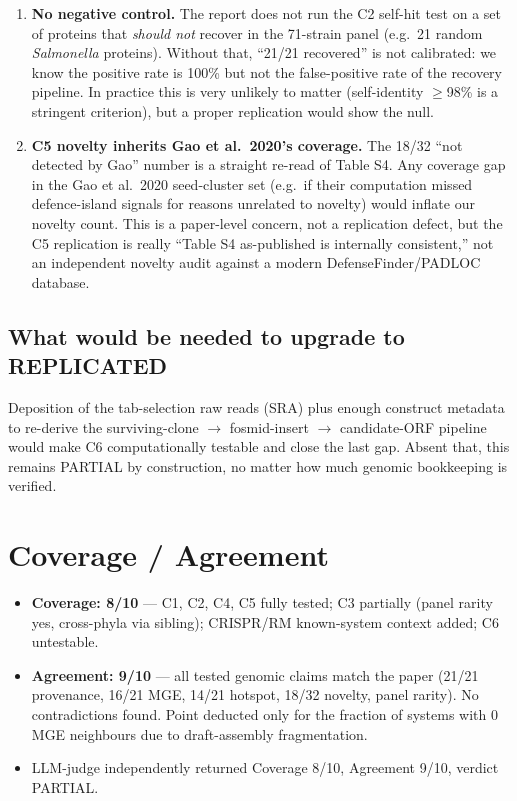 \documentclass[11pt,letterpaper]{article}
\begin{document}
\begin{enumerate}
\item \textbf{No negative control.} The report does not run the C2 self-hit test on a set of proteins that \textit{should not} recover in the 71-strain panel (e.g.\ 21 random \textit{Salmonella} proteins). Without that, ``21/21 recovered'' is not calibrated: we know the positive rate is 100\% but not the false-positive rate of the recovery pipeline. In practice this is very unlikely to matter (self-identity $\ge$98\% is a stringent criterion), but a proper replication would show the null.
\item \textbf{C5 novelty inherits Gao et al.\ 2020's coverage.} The 18/32 ``not detected by Gao'' number is a straight re-read of Table S4. Any coverage gap in the Gao et al.\ 2020 seed-cluster set (e.g.\ if their computation missed defence-island signals for reasons unrelated to novelty) would inflate our novelty count. This is a paper-level concern, not a replication defect, but the C5 replication is really ``Table S4 as-published is internally consistent,'' not an independent novelty audit against a modern DefenseFinder/PADLOC database.
\end{enumerate}

\subsection*{What would be needed to upgrade to REPLICATED}
Deposition of the tab-selection raw reads (SRA) plus enough construct metadata to re-derive the surviving-clone $\rightarrow$ fosmid-insert $\rightarrow$ candidate-ORF pipeline would make C6 computationally testable and close the last gap. Absent that, this remains PARTIAL by construction, no matter how much genomic bookkeeping is verified.

\section{Coverage / Agreement}
\begin{itemize}
    \item \textbf{Coverage: 8/10} --- C1, C2, C4, C5 fully tested; C3 partially (panel rarity yes, cross-phyla via sibling); CRISPR/RM known-system context added; C6 untestable.
    \item \textbf{Agreement: 9/10} --- all tested genomic claims match the paper (21/21 provenance, 16/21 MGE, 14/21 hotspot, 18/32 novelty, panel rarity). No contradictions found. Point deducted only for the fraction of systems with 0 MGE neighbours due to draft-assembly fragmentation.
    \item LLM-judge independently returned Coverage 8/10, Agreement 9/10, verdict PARTIAL.
\end{itemize}
\end{document}
